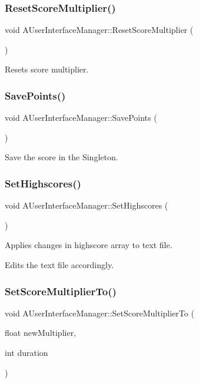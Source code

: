 \subsubsection{ResetScoreMultiplier()}
{\footnotesize\ttfamily void A\+User\+Interface\+Manager\+::\+Reset\+Score\+Multiplier (\begin{DoxyParamCaption}{ }\end{DoxyParamCaption})}



Resets score multiplier. 

\mbox{\label{class_a_user_interface_manager_a0a5b197b438c541a0b88bede9f64ad52}} 
\subsubsection{SavePoints()}
{\footnotesize\ttfamily void A\+User\+Interface\+Manager\+::\+Save\+Points (\begin{DoxyParamCaption}{ }\end{DoxyParamCaption})}



Save the score in the Singleton. 

\mbox{\label{class_a_user_interface_manager_a7d590e3c68674c78cce8f0af9a787504}} 
\subsubsection{SetHighscores()}
{\footnotesize\ttfamily void A\+User\+Interface\+Manager\+::\+Set\+Highscores (\begin{DoxyParamCaption}{ }\end{DoxyParamCaption})}



Applies changes in highscore array to text file. 

Edits the text file accordingly. \mbox{\label{class_a_user_interface_manager_a92bafd4cd76cc242921860d784799bd3}} 
\subsubsection{SetScoreMultiplierTo()}
{\footnotesize\ttfamily void A\+User\+Interface\+Manager\+::\+Set\+Score\+Multiplier\+To (\begin{DoxyParamCaption}\item[{float}]{new\+Multiplier,  }\item[{int}]{duration }\end{DoxyParamCaption})}



